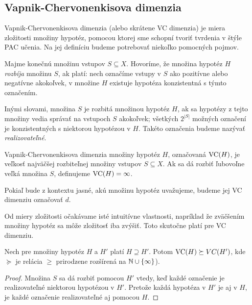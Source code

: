 \subsection{Vapnik-Chervonenkisova dimenzia}

Vapnik-Chervonenkisova dimenzia (alebo skrátene VC dimenzia) je miera
zložitosti množiny hypotéz, pomocou ktorej sme schopní tvoriť tvrdenia
v štýle PAC učenia. Na jej definíciu budeme potrebovať niekoľko pomocných
pojmov.

\begin{definition}
  Majme konečnú množinu vstupov $S \subseteq X$. Hovoríme, že množina
  hypotéz $H$ \emph{rozbíja} množinu $S$, ak platí: nech označíme vstupy
  v $S$ ako pozitívne alebo negatívne akokoľvek, v množine $H$ existuje
  hypotéza konzistentná s týmto označením.
\end{definition}

Inými slovami, množina $S$ je rozbitá množinou hypotéz $H$, ak sa hypotézy
z tejto množiny vedia správať na vstupoch $S$ akokoľvek; všetkých $2^{|S|}$
možných označení je konzistentných s niektorou hypotézou v $H$. Takéto
označenia budeme nazývať \emph{realizovateľné}.

\begin{definition}
  Vapnik-Chervonenkisova dimenzia množiny hypotéz $H$, označovaná
  $\mathrm{VC}(H)$, je veľkosť najväčšej rozbiteľnej množiny vstupov $S \subseteq X$.
  Ak sa dá rozbiť ľubovoľne veľká množina $S$, definujeme $\mathrm{VC}(H) = \infty$.
\end{definition}

Pokiaľ bude z kontextu jasné, akú množinu hypotéz uvažujeme, budeme jej
VC dimenziu označovať $d$.

Od miery zložitosti očakávame isté intuitívne vlastnosti, napríklad že
zväčšením množiny hypotéz sa môže zložitosť iba zvýšiť. Toto skutočne
platí pre VC dimenziu.

\begin{theorem}
  Nech pre množiny hypotéz $H$ a $H'$ platí $H \supseteq H'$. Potom
  $\mathrm{VC}(H) \succeq VC(H')$, kde $\succeq$ je relácia $\geq$ prirodzene
  rozšírená na $\mathbb{N} \cup \{ \infty \}$).
\end{theorem}
\begin{proof}
  Množina $S$ sa dá rozbiť pomocou $H'$ vtedy, keď každé označenie je
  realizovateľné niektorou hypotézou v $H'$. Pretože každá hypotéza v
  $H'$ je aj v $H$, je každé označenie realizovateľné aj pomocou $H$.
\end{proof}


